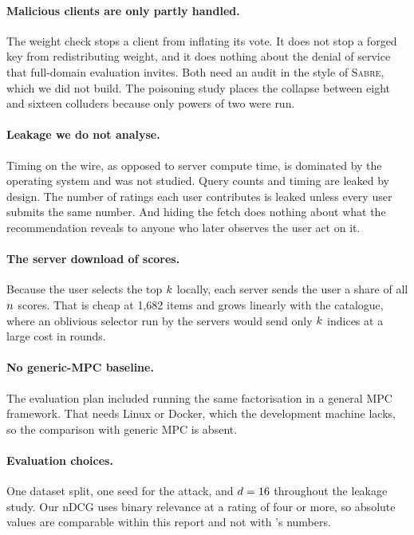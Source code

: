 \paragraph{Malicious clients are only partly handled.} The weight check stops a
client from inflating its vote. It does not stop a forged key from redistributing
weight, and it does nothing about the denial of service that full-domain
evaluation invites. Both need an audit in the style of \textsc{Sabre}, which we
did not build. The poisoning study places the collapse between eight and sixteen
colluders because only powers of two were run.

\paragraph{Leakage we do not analyse.} Timing on the wire, as opposed to server
compute time, is dominated by the operating system and was not studied. Query
counts and timing are leaked by design. The number of ratings each user
contributes is leaked unless every user submits the same number. And hiding the
fetch does nothing about what the recommendation reveals to anyone who later
observes the user act on it.

\paragraph{The server download of scores.} Because the user selects the top
$k$ locally, each server sends the user a share of all $n$ scores. That
is cheap at 1{,}682 items and grows linearly with the catalogue, where an
oblivious selector run by the servers would send only $k$ indices at a large
cost in rounds.

\paragraph{No generic-MPC baseline.} The evaluation plan included running the
same factorisation in a general MPC framework. That needs Linux or Docker, which
the development machine lacks, so the comparison with generic MPC is absent.

\paragraph{Evaluation choices.} One dataset split, one seed for the attack, and
$d = 16$ throughout the leakage study. Our nDCG uses binary relevance at a
rating of four or more, so absolute values are comparable within this report and
not with \nudgeplain{}'s numbers.
